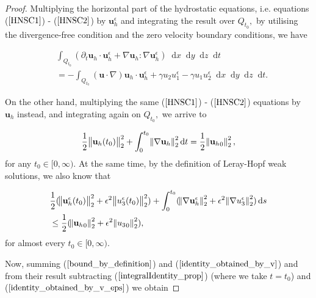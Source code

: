 \documentclass[11pt]{article}
\newcommand*\diff{\mathop{}\!\mathrm{d}}
\begin{document}
\begin{proof}

Multiplying the horizontal part of the hydrostatic equations, i.e. equations ($\ref{HNSC1}$) - ($\ref{HNSC2}$) by $\mathbf{u}_h^\epsilon$ and integrating the result over $Q_{t_0},$ by utilising the divergence-free condition and the zero velocity boundary conditions, we have

\begin{equation} \label{identity_obtained_by_v_eps}
\begin{split}
& \int_{Q_{t_0}} (\partial_t \mathbf{u}_h \cdot \mathbf{u}_h^\epsilon + \nabla \mathbf{u}_h : \nabla \mathbf{u}_h^\epsilon) \diff x \diff y \diff z \diff t \\
& = - \int_{Q_{t_0}} (\mathbf{u} \cdot \nabla) \mathbf{u}_h \cdot \mathbf{u}_h^\epsilon + \gamma u_2 u_1^\epsilon - \gamma u_1 u_2^\epsilon \diff x \diff y \diff z \diff t.
\end{split}
\end{equation}

On the other hand, multiplying the same ($\ref{HNSC1}$) - ($\ref{HNSC2}$) equations by $\mathbf{u}_h$ instead, and integrating again on $Q_{t_0},$ we arrive to

\begin{equation} \label{identity_obtained_by_v}
\frac{1}{2} \norm{\mathbf{u}_h(t_0)}_2^2 + \int_0^{t_0} \norm{\nabla \mathbf{u}_h}_2^2 \diff t = \frac{1}{2} \norm{{\mathbf{u}_h}_0}_2^2,
\end{equation}
%
for any $t_0 \in [0, \infty).$ At the same time, by the definition of Leray-Hopf weak solutions, we also know that

\begin{equation} \label{bound_by_definition}
\begin{split}
& \frac{1}{2}( \norm{\mathbf{u}_h^\epsilon (t_0)}_2^2 + \epsilon^2 \norm{u_3^\epsilon(t_0)}_2^2)+ \int_0^{t_0} (\norm{\nabla \mathbf{u}_h^\epsilon}_2^2 + \epsilon^2 \norm{\nabla u_3^\epsilon}_2^2) \diff s \\
& \leq \frac{1}{2} (\norm{{\mathbf{u}_h}_0}_2^2 + \epsilon^2 \norm{{u_3}_0}_2^2),
\end{split}
\end{equation}
%
for almost every $t_0 \in [0, \infty).$

Now, summing ($\ref{bound_by_definition}$) and ($\ref{identity_obtained_by_v}$) and from their result subtracting ($\ref{integralIdentity_prop}$) (where we take $t= t_0$) and ($\ref{identity_obtained_by_v_eps}$) we obtain


\end{proof}
\end{document}
